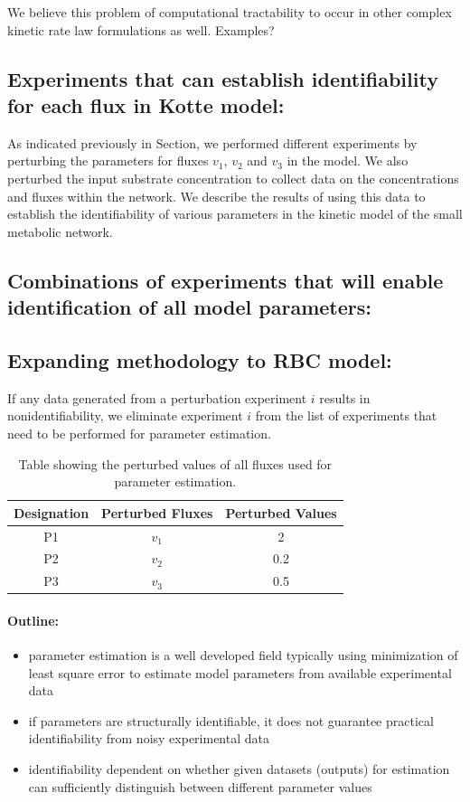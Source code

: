 \documentclass[10pt]{article}
\begin{document}
We believe this problem of computational tractability to occur in other complex kinetic rate law formulations as well. Examples?

\subsection{Experiments that can establish identifiability for each flux in Kotte model:}	
As indicated previously in Section, we performed different experiments by perturbing the parameters for fluxes $v_1$, $v_2$ and $v_3$ in the model. We also perturbed the input substrate concentration to collect data on the concentrations and fluxes within the network. We describe the results of using this data to establish the identifiability of various parameters in the kinetic model of the small metabolic network.

\subsection{Combinations of experiments that will enable identification of all model parameters:}
\subsection{Expanding methodology to RBC model:}



If any data generated from a perturbation experiment $i$ results in nonidentifiability, we eliminate experiment $i$ from the list of experiments that need to be performed for parameter estimation.



\begin{table}[!tbhp]
	\caption{Table showing the perturbed values of all fluxes used for parameter estimation.}
	\begin{center}				
		\begin{tabular}{ccc}
			Designation & Perturbed Fluxes & Perturbed Values\\
			\hline
			P1 & $v_1$ & 2\\
			P2 & $v_2$ & 0.2\\
			P3 & $v_3$ & 0.5
		\end{tabular}
	\end{center}	
	\label{tab:pval}
\end{table}

\paragraph{Outline:}
\begin{itemize}
	\item parameter estimation is a well developed field typically using minimization of least square error to estimate model parameters from available experimental data
	\item if parameters are structurally identifiable, it does not guarantee practical identifiability from noisy experimental data
	\item identifiability dependent on whether given datasets (outputs) for estimation can sufficiently distinguish between different parameter values
\end{itemize}
\end{document}
